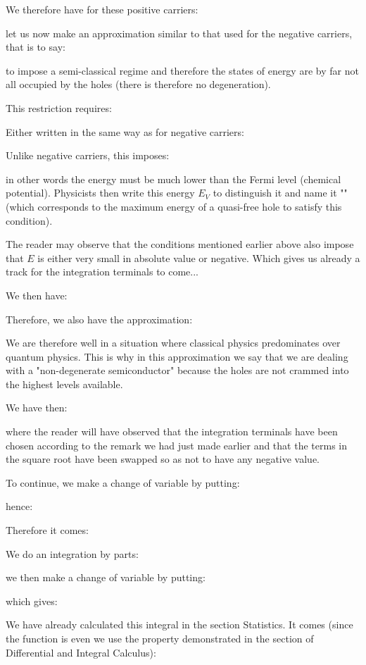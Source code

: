 	We therefore have for these positive carriers:
	
	let us now make an approximation similar to that used for the negative carriers, that is to say:
	
	to impose a semi-classical regime and therefore the states of energy are by far not all occupied by the holes (there is therefore no degeneration).

	This restriction requires:
	
	Either written in the same way as for negative carriers:
	
	Unlike negative carriers, this imposes:
	
	in other words the energy must be much lower than the Fermi level (chemical potential). Physicists then write this energy $E_V$ to distinguish it and name it "" (which corresponds to the maximum energy of a quasi-free hole to satisfy this condition).
	\begin{tcolorbox}[title=Remark,colframe=black,arc=10pt]
	The reader may observe that the conditions mentioned earlier above also impose that $E$ is either very small in absolute value or negative. Which gives us already a track for the integration terminals to come...
	\end{tcolorbox}	
	We then have:
	
	Therefore, we also have the approximation:
	
	We are therefore well in a situation where classical physics predominates over quantum physics. This is why in this approximation we say that we are dealing with a "non-degenerate semiconductor" because the holes are not crammed into the highest levels available.

	We have then:
	
	where the reader will have observed that the integration terminals have been chosen according to the remark we had just made earlier and that the terms in the square root have been swapped so as not to have any negative value.

	To continue, we make a change of variable by putting:
	
	hence:
	
	Therefore it comes:
	
	We do an integration by parts:
	
	we then make a change of variable by putting:
	
	which gives:
	
	We have already calculated this integral in the section Statistics. It comes (since the function is even we use the property demonstrated in the section of Differential and Integral Calculus):
	
